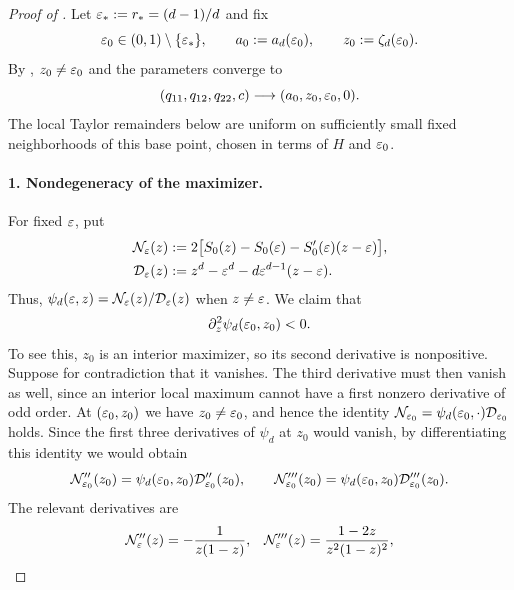 \begin{proof}[Proof of ]
Let $\varepsilon_*:=r_*=(d-1)/d$
and fix
\[
  \varepsilon_0\in(0,1)\setminus\{\varepsilon_*\},
  \qquad
  a_0:=a_d(\varepsilon_0),
  \qquad
  z_0:=\zeta_d(\varepsilon_0).
\]
By , \(z_0\ne\varepsilon_0\) and the parameters converge to
\begin{equation}\label{eq:krrs-parameter-limits}
  (q_{11},q_{12},q_{22},c)\longrightarrow(a_0,z_0,\varepsilon_0,0).
\end{equation}
The local Taylor remainders below are uniform on sufficiently small fixed
neighborhoods of this base point, chosen in terms of $H$ and $\varepsilon_0$.

\paragraph{1. Nondegeneracy of the maximizer.}
For fixed \(\varepsilon\), put
\begin{align}
  \mathcal N_\varepsilon(z)
  &:=2\bigl[S_0(z)-S_0(\varepsilon)-S_0'(\varepsilon)(z-\varepsilon)\bigr],\label{eq:krrs-entropy-remainder}\\
  \mathcal D_\varepsilon(z)
  &:=z^d-\varepsilon^d-d\varepsilon^{d-1}(z-\varepsilon).\label{eq:krrs-moment-remainder}
\end{align}
Thus, \(\psi_d(\varepsilon,z)=\mathcal N_\varepsilon(z)/\mathcal D_\varepsilon(z)\) when
\(z\ne\varepsilon\).  We claim that
\begin{equation}\label{eq:krrs-maximizer-nondegeneracy}
  \partial_z^2\psi_d(\varepsilon_0,z_0)<0.
\end{equation}
To see this, \(z_0\) is an interior maximizer, so its second derivative is
nonpositive.  Suppose for contradiction that it vanishes.  The third
derivative must then vanish as well, since an interior local maximum cannot
have a first nonzero derivative of odd order.  At \((\varepsilon_0,z_0)\) we have
\(z_0\ne\varepsilon_0\), and hence the identity
\(\mathcal N_{\varepsilon_0}=\psi_d(\varepsilon_0,\cdot)\mathcal D_{\varepsilon_0}\) holds.  Since the first three derivatives of \(\psi_d\)
at \(z_0\) would vanish, by differentiating this identity we would obtain
\begin{equation}\label{eq:krrs-ratio-derivatives}
  \mathcal N_{\varepsilon_0}''(z_0)
    =\psi_d(\varepsilon_0,z_0)\mathcal D_{\varepsilon_0}''(z_0),
  \qquad
  \mathcal N_{\varepsilon_0}'''(z_0)
    =\psi_d(\varepsilon_0,z_0)\mathcal D_{\varepsilon_0}'''(z_0).
\end{equation}
The relevant derivatives are
\begin{align*}
  \mathcal N_\eps''(z)&=-\frac1{z(1-z)},
  &
  \mathcal N_\eps'''(z)&=\frac{1-2z}{z^2(1-z)^2},\\

\end{align*}
\end{proof}
